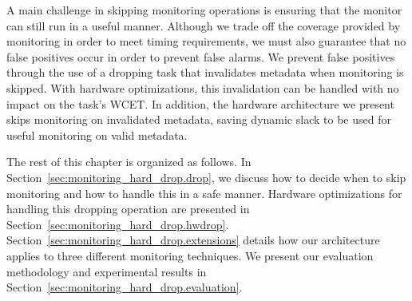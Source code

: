 A main challenge in skipping monitoring operations is ensuring that the monitor
can still run in a useful manner. Although we trade off the coverage provided
by monitoring in order to meet timing requirements, we must also  guarantee
that no false positives occur in order to prevent false alarms.
We prevent false positives through the use of a dropping task that invalidates
metadata when monitoring is skipped.
With hardware optimizations, this invalidation can be handled with no impact on
the task's WCET. In addition, the hardware architecture we present skips
monitoring on invalidated metadata, saving dynamic slack to be used for useful
monitoring on valid metadata.

The rest of this chapter is organized as follows. In
Section~\ref{sec:monitoring_hard_drop.drop}, we discuss how to decide when to
skip monitoring and how to handle this in a safe manner. Hardware optimizations
for handling this dropping operation are presented in
Section~\ref{sec:monitoring_hard_drop.hwdrop}.
Section~\ref{sec:monitoring_hard_drop.extensions} details how our architecture
applies to three different monitoring techniques.  We present our evaluation
methodology and experimental results in
Section~\ref{sec:monitoring_hard_drop.evaluation}. 

